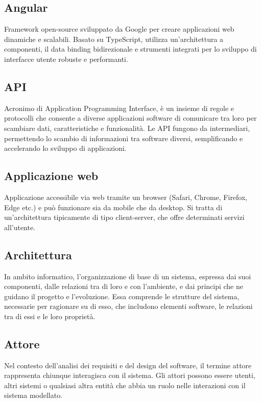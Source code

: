 \subsection*{Angular}
Framework open-source sviluppato da Google per creare applicazioni web dinamiche e scalabili. Basato su TypeScript, utilizza un'architettura a componenti, 
il data binding bidirezionale e strumenti integrati per lo sviluppo di interfacce utente robuste e performanti.

\hypertarget{sec:api}{}
\subsection*{API}
Acronimo di Application Programming Interface, è un insieme di regole e protocolli che consente a diverse applicazioni software di comunicare tra loro 
per scambiare dati, caratteristiche e funzionalità. Le API fungono da intermediari, permettendo lo scambio di informazioni tra software diversi, semplificando 
e accelerando lo sviluppo di applicazioni.

\hypertarget{sec:applicazione_web}{}
\subsection*{Applicazione web}
Applicazione accessibile via web tramite un browser (Safari, Chrome, Firefox, Edge etc.) e può funzionare sia da mobile che da desktop. Si tratta di un'architettura 
tipicamente di tipo client-server, che offre determinati servizi all'utente.

\hypertarget{sec:architettura}{}
\subsection*{Architettura}
In ambito informatico, l'organizzazione di base di un sistema, espressa dai suoi componenti, dalle relazioni tra di loro e con l'ambiente, 
e dai principi che ne guidano il progetto e l'evoluzione. Essa comprende le strutture del sistema, necessarie per ragionare su di esso, 
che includono elementi software, le relazioni tra di essi e le loro proprietà.

\hypertarget{sec:attore}{}
\subsection*{Attore}
Nel contesto dell'analisi dei requisiti e del design del software, il termine attore rappresenta chiunque interagisca con il sistema. Gli attori possono 
essere utenti, altri sistemi o qualsiasi altra entità che abbia un ruolo nelle interazioni con il sistema modellato.

